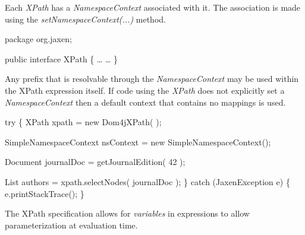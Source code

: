 \documentclass[20pt,landscape,headrule,footrule]{foils}
\begin{document}


Each \emph{XPath} has a \emph{NamespaceContext} associated with
it.  The association is made using the \emph{setNamespaceContext(...)}
method.

\begin{codelisting}
package org.jaxen;

public interface XPath
\{
    \dots
    \dots
\}
\end{codelisting}

Any prefix that is resolvable through the \emph{NamespaceContext} may
be used within the XPath expression itself.  
If code using the
\emph{XPath} does not explicitly set a \emph{NamespaceContext} then
a default context that contains no mappings is used.




\begin{codelisting}
try
\{
    XPath xpath = new Dom4jXPath(  );

    SimpleNamespaceContext nsContext = new SimpleNamespaceContext();


    Document journalDoc = getJournalEdition( 42 );

    List authors = xpath.selectNodes( journalDoc );
\}
catch (JaxenException e)
\{
    e.printStackTrace();
\}

\end{codelisting}



The XPath specification allows for \emph{variables} in expressions
to allow parameterization at evaluation time.
\end{document}
